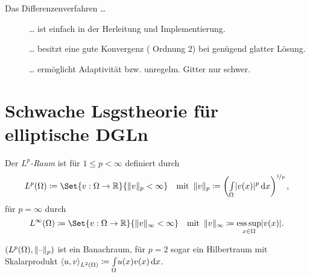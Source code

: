 \documentclass{cheat-sheet}
\newcommand{\Cont}{\mathcal{C}} %
\newcommand{\IntOmega}[2]{\AInt{\Omega}{#1}{#2}} %
\newcommand{\scp}[2]{\left\langle #1 , #2 \right\rangle} %
\DeclareMathOperator*{\esssup}{ess\,sup} %
\begin{document}
\begin{bem}
  Das Differenzenverfahren \ldots
  \begin{description}
    \item[{\Smiley[1.2]}] \ldots{} ist einfach in der Herleitung und Implementierung. 
    \item[{\Neutrey[1.2]}] \ldots{} besitzt eine gute Konvergenz (\zB{} Ordnung 2) bei genügend glatter Lösung. 
    \item[{\Sadey[1.2]}] \ldots{} ermöglicht Adaptivität bzw. unregelm. Gitter nur schwer. 
  \end{description}
\end{bem}

\vspace{8cm}



\section{Schwache Lsgstheorie für elliptische DGLn}

\iffalse
\begin{bspe}
  \begin{itemize}
    \item $u''(x) = f$ in $\Omega = \ointerval{0}{1}$, $u(0) = g_0$, $u'(0) = g_1$
    \item $u_t(x, t) + c u_x(x, t) = 0$, $u(x, 0) = g(x)$, $g \in \Cont^1$. Lösung: $u(x, t) = g(x - c t)$
  \end{itemize}
\end{bspe}
\fi


\begin{defn}
  Der \emph{$L^p$-Raum} ist für $1 \leq p < \infty$ definiert durch
  \[
    L^p(\Omega) \coloneqq \Set{v : \Omega \to \R}{\norm{v}_p < \infty}
    \quad \text{mit} \enspace
    \norm{v}_p \coloneqq \left( \IntOmega{\abs{v(x)}^p}{x} \right)^{\nicefrac{1}{p}},
  \]
  für $p = \infty$ durch
  \[
    L^\infty(\Omega) \coloneqq \Set{v : \Omega \to \R}{\norm{v}_\infty < \infty}
    \quad \text{mit} \enspace
    \norm{v}_\infty \coloneqq \esssup_{x \in \Omega} \abs{v(x)}.
  \]
\end{defn}


\begin{bem}
  $(L^p(\Omega), \lVert\text{--}\rVert_p)$ ist ein Banachraum, für $p = 2$ sogar ein Hilbertraum mit Skalarprodukt $\scp{u}{v}_{L^2(\Omega)} \coloneqq \AInt{\Omega}{u(x) v(x)}{x}$.
\end{bem}
\end{document}
